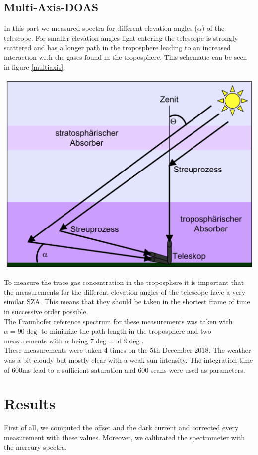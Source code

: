 \documentclass[12pt, english]{scrartcl} %
\newenvironment{Figure}
  {\par\medskip\noindent\minipage{\linewidth}}
  {\endminipage\par\medskip}
\begin{document}
\begin{multicols}{2}
\subsection{Multi-Axis-DOAS}
In this part we measured spectra for different elevation angles ($\alpha$) of the telescope. For smaller elevation angles light entering the telescope is strongly scattered and has a longer path in the troposphere leading to an increased interaction with the gases found in the troposphere. This schematic can be seen in figure \ref{multiaxis}.
\begin{Figure}
 \centering
 \captionsetup{format=plain}
 \includegraphics[width=\linewidth]{graphics/multiaxis.png}
 \label{multiaxis}
\end{Figure}
To measure the trace gas concentration in the troposphere it is important that the measurements for the different elevation angles of the telescope have a very similar SZA. This means that they should be taken in the shortest frame of time in successive order possible.\\
The Fraunhofer reference spectrum for these measurements was taken with $\alpha = 90\deg$ to minimize the path length in the troposphere and two measurements with $\alpha$ being $7 \deg$ and $9 \deg$.\\
These measurements were taken 4 times on the 5th December 2018. The weather was a bit cloudy but mostly clear with a weak sun intensity.
The integration time of $600$ms lead to a sufficient saturation and 600 scans were used as parameters.
\section{Results}
First of all, we computed the offset and the dark current and corrected every measurement with these values. Moreover, we calibrated the spectrometer with the mercury spectra. 

\end{multicols}
\end{document}
